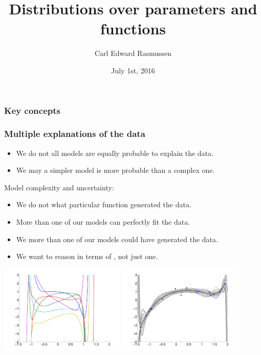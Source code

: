 

\title{Distributions over parameters and functions}
\author{Carl Edward Rasmussen}
\date{July 1st, 2016}



\begin{frame}
\titlepage
\end{frame}

\begin{frame}
\frametitle{Key concepts}

\end{frame}


\begin{frame}
\frametitle{Multiple explanations of the data}

\vspace{-0.5ex}
\begin{itemize}
\item We do not  all models are equally probable to explain the data.
\item We may  a simpler model is more probable than a complex one.
\end{itemize}
%
Model complexity and uncertainty:
\vspace{-0.5ex}
\begin{itemize}
\item We do not  what particular function generated the data.
\item More than one of our models can perfectly fit the data.
\item We  more than one of our models could have generated the data.
\item We want to reason in terms of , not just one.
\end{itemize}
%
\centerline{
\includegraphics[width=0.45\textwidth]{random_polynomials_degree17.pdf}
\includegraphics[width=0.45\textwidth]{samples_posterior_degree17.pdf}
}
%
\end{frame}

